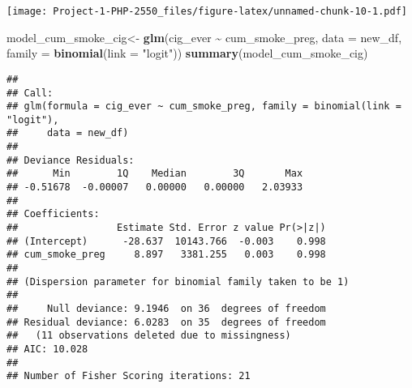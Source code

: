 \documentclass[
]{article}
\newenvironment{Shaded}{\begin{snugshade}}{\end{snugshade}}
\newcommand{\AttributeTok}[1]{\textcolor[rgb]{0.13,0.29,0.53}{#1}}
\newcommand{\CommentTok}[1]{\textcolor[rgb]{0.56,0.35,0.01}{\textit{#1}}}
\newcommand{\FunctionTok}[1]{\textcolor[rgb]{0.13,0.29,0.53}{\textbf{#1}}}
\newcommand{\NormalTok}[1]{#1}
\newcommand{\OtherTok}[1]{\textcolor[rgb]{0.56,0.35,0.01}{#1}}
\newcommand{\SpecialCharTok}[1]{\textcolor[rgb]{0.81,0.36,0.00}{\textbf{#1}}}
\newcommand{\StringTok}[1]{\textcolor[rgb]{0.31,0.60,0.02}{#1}}
\begin{document}
\begin{Shaded}
\end{Shaded}

\texttt{[image: Project-1-PHP-2550\_files/figure-latex/unnamed-chunk-10-1.pdf]}

\begin{Shaded}
\begin{Highlighting}[]
\NormalTok{model\_cum\_smoke\_cig}\OtherTok{\textless{}{-}} \FunctionTok{glm}\NormalTok{(cig\_ever }\SpecialCharTok{\textasciitilde{}}\NormalTok{ cum\_smoke\_preg, }\AttributeTok{data =}\NormalTok{ new\_df, }\AttributeTok{family =} \FunctionTok{binomial}\NormalTok{(}\AttributeTok{link =} \StringTok{"logit"}\NormalTok{))}
\FunctionTok{summary}\NormalTok{(model\_cum\_smoke\_cig)}
\end{Highlighting}
\end{Shaded}

\begin{verbatim}
## 
## Call:
## glm(formula = cig_ever ~ cum_smoke_preg, family = binomial(link = "logit"), 
##     data = new_df)
## 
## Deviance Residuals: 
##      Min        1Q    Median        3Q       Max  
## -0.51678  -0.00007   0.00000   0.00000   2.03933  
## 
## Coefficients:
##                 Estimate Std. Error z value Pr(>|z|)
## (Intercept)      -28.637  10143.766  -0.003    0.998
## cum_smoke_preg     8.897   3381.255   0.003    0.998
## 
## (Dispersion parameter for binomial family taken to be 1)
## 
##     Null deviance: 9.1946  on 36  degrees of freedom
## Residual deviance: 6.0283  on 35  degrees of freedom
##   (11 observations deleted due to missingness)
## AIC: 10.028
## 
## Number of Fisher Scoring iterations: 21
\end{verbatim}
\end{document}
